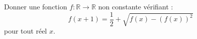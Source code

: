 Donner une fonction $f : \mathbb{R} \to \mathbb{R}$ non constante vérifiant :
\[
f(x+1) = \frac{1}{2} + \sqrt{f(x) - (f(x))^2}
\]
pour tout réel $x$.
